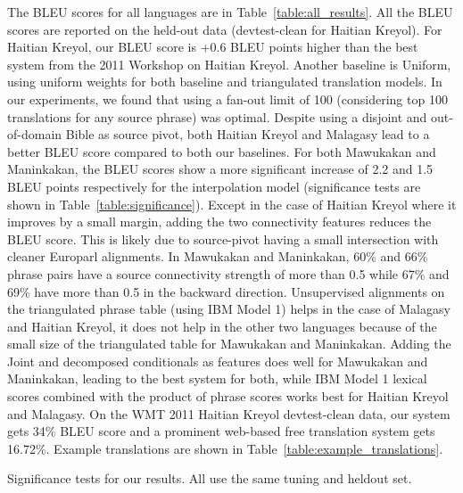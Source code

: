 \documentclass[11pt]{article}
\begin{document}
	The BLEU scores for all languages are in Table~\ref{table:all_results}. All the BLEU scores are reported on the held-out data (devtest-clean for Haitian Kreyol). For Haitian Kreyol, our BLEU score is +0.6 BLEU points higher than the best system from the 2011 Workshop on Haitian Kreyol. Another baseline is Uniform, using uniform weights for both baseline and triangulated translation models.  
	In our experiments, we found that using a fan-out limit of 100 (considering top 100 translations for any source phrase) was optimal. 
	Despite using a disjoint and out-of-domain Bible as source pivot, both Haitian Kreyol and Malagasy lead to a better BLEU score compared to both our baselines. 
	For both Mawukakan and Maninkakan, the BLEU scores show a more significant increase of 2.2 and 1.5 BLEU points respectively for the interpolation model (significance tests are shown in Table~\ref{table:significance}). 
	Except in the case of Haitian Kreyol where it improves by a small margin, adding the two connectivity features reduces the BLEU score. This is likely due to source-pivot having a small intersection with cleaner Europarl alignments. In Mawukakan and Maninkakan, 60\% and 66\% phrase pairs have a source connectivity strength of more than 0.5 while 67\% and 69\% have more than 0.5 in the backward direction.
Unsupervised alignments on the triangulated phrase table (using IBM Model 1) helps in the case of Malagasy and Haitian Kreyol, it does not help in the other two languages because of the small size of the triangulated table for Mawukakan and Maninkakan. Adding the Joint and decomposed conditionals as features does well for Mawukakan and Maninkakan, leading to the best system for both, while IBM Model 1 lexical scores combined with the product of phrase scores works best for Haitian Kreyol and Malagasy. On the WMT 2011 Haitian Kreyol devtest-clean data, our system gets 34\% BLEU score and a prominent web-based free translation system gets 16.72\%. Example translations are shown in Table~\ref{table:example_translations}. 
		\begin{table}
			{\footnotesize
			
			}
			\caption{Significance tests for our results. All use the same tuning and heldout set.}
			\label{table:significance}
		\end{table}
\end{document}
